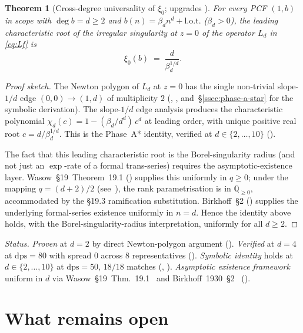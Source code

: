 \documentclass[11pt,reqno]{amsart}
\theoremstyle{plain}
\newtheorem{theorem}{Theorem}[section]
\theoremstyle{definition}
\theoremstyle{remark}
\newcommand{\dps}{\mathrm{dps}}
\begin{document}
\begin{theorem}[Cross-degree universality of $\xi_0$;
upgrades {\cite[Conj.~3.3.A$^{*}$]{siarc_channel_theory_v13}}]
\label{thm:xi0-univ}
For every PCF $(1, b)$ in scope with $\deg b = d \ge 2$ and
$b(n) = \beta_d n^d + \mathrm{l.o.t.}$ ($\beta_d > 0$), the
leading characteristic root of the irregular singularity at
$z = 0$ of the operator $L_d$ in \eqref{eq:Lf} is
\[
  \xi_0(b) \;=\; \frac{d}{\beta_d^{1/d}}.
\]
\end{theorem}

\begin{proof}[Proof sketch]
The Newton polygon of $L_d$ at $z = 0$ has the single
non-trivial slope-$1/d$ edge $(0,0) \to (1,d)$ of multiplicity
$2$ (, , and~\S\ref{ssec:phase-a-star}
for the symbolic derivation). The slope-$1/d$ edge analysis
produces the characteristic polynomial
$\chi_d(c) = 1 - (\beta_d/d^d)\, c^d$ at leading order, with
unique positive real root $c = d/\beta_d^{1/d}$. This is the
Phase~A* identity, verified at $d \in \{2,\ldots,10\}$
().

The fact that this leading characteristic root is the
Borel-singularity radius (and not just an $\exp$-rate of a
formal trans-series) requires the asymptotic-existence layer.
Wasow~\S19~Theorem~19.1 () supplies this
uniformly in $q \ge 0$; under the mapping $q = (d+2)/2$
(see~), the rank parametrisation is in
$\mathbb{Q}_{\ge 0}$, accommodated by the §19.3 ramification
substitution. Birkhoff~\S2 () supplies the
underlying formal-series existence uniformly in $n = d$. Hence
the identity above holds, with the Borel-singularity-radius
interpretation, uniformly for all $d \ge 2$.
\end{proof}

\noindent\emph{Status.} \emph{Proven} at $d = 2$ by direct
Newton-polygon argument (). \emph{Verified}
at $d = 4$ at $\dps = 80$ with spread $0$ across $8$
representatives (). \emph{Symbolic identity}
holds at $d \in \{2,\ldots,10\}$ at $\dps = 50$, $18/18$
matches (,
\cite{siarc_q20a_phase_c_resume}). \emph{Asymptotic existence
framework} uniform in $d$ via
Wasow~\S19~Thm.~19.1~\cite{wasow1965asymptotic} and
Birkhoff~1930~\S2~\cite{birkhoff1930formal} ().

\section{What remains open}
\label{sec:open}
\end{document}
